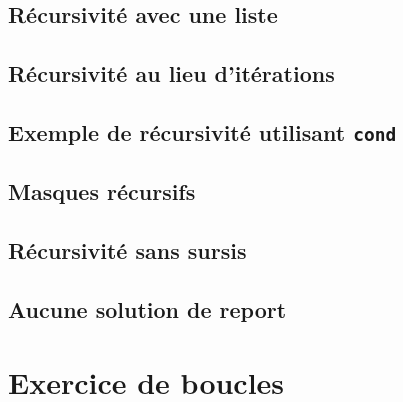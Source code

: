  \subsection{Récursivité avec une liste}

 \subsection{Récursivité au lieu d'itérations}

\subsection{Exemple de récursivité utilisant
  \texttt{cond}}

 \subsection{Masques récursifs}

 \subsection{Récursivité sans sursis}

 \subsection{Aucune solution de report}

 \section{Exercice de boucles}



